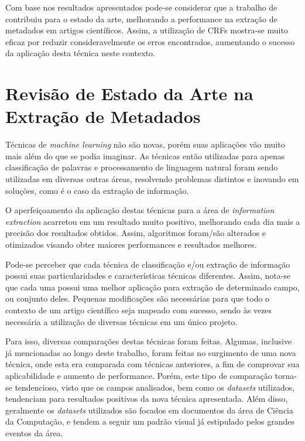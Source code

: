\begin{textedited}
Com base nos resultados apresentados pode-se considerar que a trabalho de \cite{Peng-CRF-IE} contribuiu para o estado da arte, melhorando a performance na extração de metadados em artigos científicos. Assim, a utilização de CRFs mostra-se muito eficaz por reduzir consideravelmente os erros encontrados, aumentando o sucesso da aplicação desta técnica neste contexto.
\end{textedited}




\section{Revisão de Estado da Arte na Extração de Metadados}
\label{sec:revision}

\begin{textnew}


Técnicas de \emph{machine learning} não são novas, porém suas aplicações vão muito mais além do que se podia imaginar. As técnicas então utilizadas para apenas classificação de palavras e processamento de linguagem natural foram sendo utilizadas em diversas outras áreas, resolvendo problemas distintos e inovando em soluções, como é o caso da extração de informação.

O aperfeiçoamento da aplicação destas técnicas para a área de \emph{information extraction} acarretou em um resultado muito positivo, melhorando cada dia mais a precisão dos resultados obtidos. Assim, algoritmos foram/são alterados e otimizados visando obter maiores performances e resultados melhores.

Pode-se perceber que cada técnica de classificação e/ou extração de informação possui suas particularidades e características técnicas diferentes. Assim, nota-se que cada uma possui uma melhor aplicação para extração de determinado campo, ou conjunto deles. Pequenas modificações são necessárias para que todo o contexto de um artigo científico seja mapeado com sucesso, sendo às vezes necessária a utilização de diversas técnicas em um único projeto.

Para isso, diversas comparações destas técnicas foram feitas. Algumas, inclusive já mencionadas ao longo deste trabalho, foram feitas no surgimento de uma nova técnica, onde esta era comparada com técnicas anteriores, a fim de comprovar sua aplicabilidade e aumento de performance. Porém, este tipo de comparação torna-se tendencioso, visto que os campos analisados, bem como os \emph{datasets} utilizados, tendenciam para resultados positivos da nova técnica apresentada. Além disso, geralmente os \emph{datasets} utilizados são focados em documentos da área de Ciência da Computação, e tendem a seguir um padrão visual já estipulado pelos grandes eventos da área.


\end{textnew}
